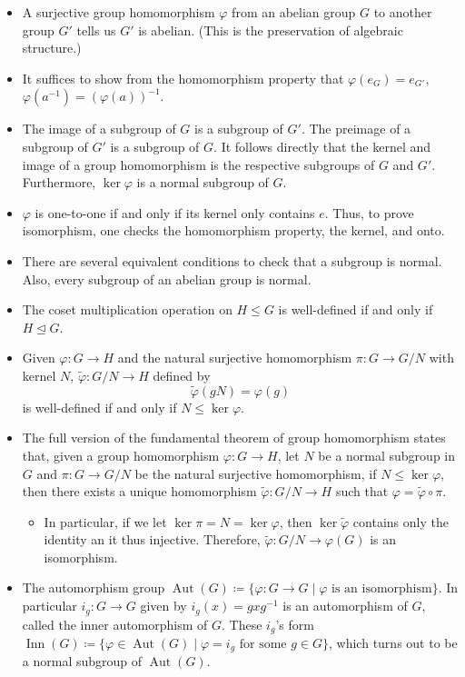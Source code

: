 \documentclass{article}
\newcommand{\aut}{\operatorname{Aut}}
\newcommand{\inn}{\operatorname{Inn}}
\renewcommand{\phi}{\varphi}
\begin{document}
\begin{itemize}
    \item A surjective group homomorphism $\phi$ from an abelian group $G$ to another group $G'$ tells us $G'$ is abelian. (This is the preservation of algebraic structure.)
    \item It suffices to show from the homomorphism property that $\phi(e_G) = e_{G'}$, $\phi(a^{-1}) = (\phi(a))^{-1}$.
    \item The image of a subgroup of $G$ is a subgroup of $G'$. The preimage of a subgroup of $G'$ is a subgroup of $G$. It follows directly that the kernel and image of a group homomorphism is the respective subgroups of $G$ and $G'$. Furthermore, $\ker \phi$ is a normal subgroup of $G$.
    \item $\phi$ is one-to-one if and only if its kernel only contains $e$. Thus, to prove isomorphism, one checks the homomorphism property, the kernel, and onto.
    \item There are several equivalent conditions to check that a subgroup is normal. Also, every subgroup of an abelian group is normal.
    \item The coset multiplication operation on $H \leq G$ is well-defined if and only if $H \trianglelefteq G$.
    \item Given $\phi: G \to H$ and the natural surjective homomorphism $\pi: G \to G/N$ with kernel $N$, $\tilde{\phi}: G/N \to H$ defined by $$\tilde{\phi}(gN) = \phi(g)$$ is well-defined if and only if $N \leq \ker \phi$.
    \item The full version of the fundamental theorem of group homomorphism states that, given a group homomorphism $\phi: G \to H$, let $N$ be a normal subgroup in $G$ and $\pi: G \to G/N$ be the natural surjective homomorphism, if $N \leq \ker \phi$, then there exists a unique homomorphism $\tilde{\phi}: G/N \to H$ such that $\phi = \tilde{\phi} \circ \pi$.
    \begin{itemize}
        \item In particular, if we let $\ker \pi = N = \ker \phi $, then $\ker \tilde{\phi}$ contains only the identity an it thus injective. Therefore, $\tilde{\phi}: G/N \to \phi(G)$ is an isomorphism.
    \end{itemize}
    \item The automorphism group $\aut(G) \coloneqq \{\phi: G \to G \mid \phi \text{ is an isomorphism}\}$. In particular $i_g: G \to G$ given by $i_g(x) = g x g^{-1}$ is an automorphism of $G$, called the inner automorphism of $G$. These $i_g$'s form $\inn(G) \coloneqq \{\phi \in \aut(G) \mid \phi = i_g \text{ for some } g \in G\}$, which turns out to be a normal subgroup of $\aut(G)$.

\end{itemize}
\end{document}
